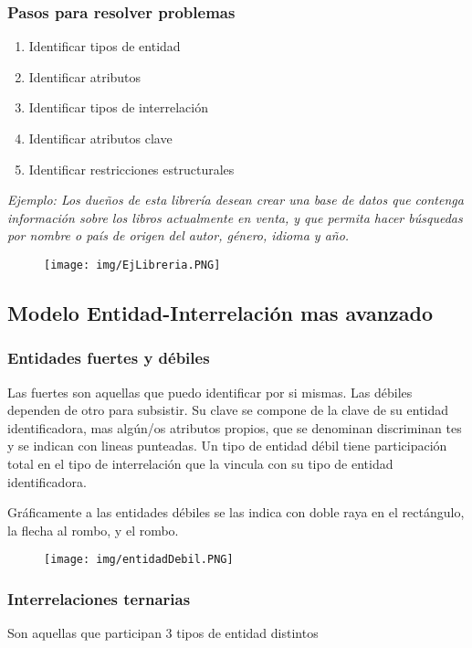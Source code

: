 \subsubsection*{Pasos para resolver problemas}
\begin{enumerate}
\item Identificar tipos de entidad
\item Identificar atributos
\item Identificar tipos de interrelación
\item Identificar atributos clave
\item Identificar restricciones estructurales
\end{enumerate}

\textit{Ejemplo: Los dueños de esta librería desean crear una base de
datos que contenga información sobre los libros
actualmente en venta, y que permita hacer búsquedas por
nombre o país de origen del autor, género, idioma y año.}

\begin{figure}[!htb]
    \centering
    \texttt{[image: img/EjLibreria.PNG]}
\end{figure}

\subsection*{Modelo Entidad-Interrelación mas avanzado}
\subsubsection*{Entidades fuertes y débiles}
Las fuertes son aquellas que puedo identificar por si mismas.
Las débiles dependen de otro para subsistir. Su clave se compone de la clave de su entidad identificadora, mas algún/os atributos propios, que se denominan discriminan tes y se indican con lineas punteadas. Un tipo de entidad débil tiene participación total en el tipo de interrelación que la vincula con su tipo de entidad identificadora.

Gráficamente a las entidades débiles se las indica con doble raya en el rectángulo, la flecha al rombo, y el rombo.

\begin{figure}[!htb]
    \centering
    \texttt{[image: img/entidadDebil.PNG]}
\end{figure}

\subsubsection*{Interrelaciones ternarias}
Son aquellas que participan 3 tipos de entidad distintos

